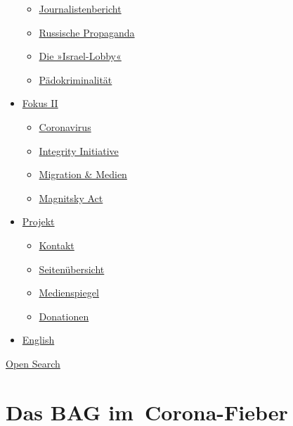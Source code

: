 \begin{itemize}
  \begin{itemize}
  \tightlist
  \item
    \href{https://swprs.org/bericht-eines-journalisten/}{Journalistenbericht}
  \item
    \href{https://swprs.org/russische-propaganda/}{Russische Propaganda}
  \item
    \href{https://swprs.org/die-israel-lobby-fakten-und-mythen/}{Die
    »Israel-Lobby«}
  \item
    \href{https://swprs.org/geopolitik-und-paedokriminalitaet/}{Pädokriminalität}
  \end{itemize}
\item
  \href{https://swprs.org/migration-und-medien/}{Fokus II}

  \begin{itemize}
  \tightlist
  \item
    \href{https://swprs.org/covid-19-hinweis-ii/}{Coronavirus}
  \item
    \href{https://swprs.org/die-integrity-initiative/}{Integrity
    Initiative}
  \item
    \href{https://swprs.org/migration-und-medien/}{Migration \& Medien}
  \item
    \href{https://swprs.org/der-fall-magnitsky/}{Magnitsky Act}
  \end{itemize}
\item
  \href{https://swprs.org/kontakt/}{Projekt}

  \begin{itemize}
  \tightlist
  \item
    \href{https://swprs.org/kontakt/}{Kontakt}
  \item
    \href{https://swprs.org/uebersicht/}{Seitenübersicht}
  \item
    \href{https://swprs.org/medienspiegel/}{Medienspiegel}
  \item
    \href{https://swprs.org/donationen/}{Donationen}
  \end{itemize}
\item
  \href{https://swprs.org/contact/}{English}
\end{itemize}

\protect\hyperlink{}{Open Search}

\hypertarget{das-bag-im-corona-fieber}{%
\section{Das BAG im~Corona-Fieber}\label{das-bag-im-corona-fieber}}

